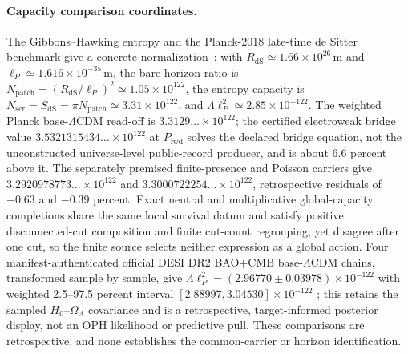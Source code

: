 \paragraph{Capacity comparison coordinates.}
The Gibbons--Hawking entropy and the Planck-2018 late-time de Sitter
benchmark give a concrete normalization~\cite{gibbonsHawking77,planck18}:
with \(R_{\mathrm{dS}}\simeq1.66\times10^{26}\,\mathrm m\) and
\(\ell_P\simeq1.616\times10^{-35}\,\mathrm m\), the bare horizon ratio is
\(N_{\mathrm{patch}}=(R_{\mathrm{dS}}/\ell_P)^2\simeq1.05\times10^{122}\), the
entropy capacity is
\(N_{\mathrm{scr}}=S_{\mathrm{dS}}=\pi N_{\mathrm{patch}}\simeq3.31\times10^{122}\),
and \(\Lambda\ell_P^2\simeq2.85\times10^{-122}\). The weighted Planck
base-\(\Lambda\)CDM read-off is \(3.3129\ldots\times10^{122}\); the certified
electroweak bridge value \(3.5321315434\ldots\times10^{122}\) at
\(P_{\mathrm{fwd}}\) solves the declared bridge equation, not the
unconstructed universe-level public-record producer, and is about \(6.6\)
percent above it. The separately premised finite-presence and Poisson carriers
give \(3.2920978773\ldots\times10^{122}\) and \(3.3000722254\ldots\times10^{122}\),
retrospective residuals of \(-0.63\) and \(-0.39\) percent. Exact neutral and
multiplicative global-capacity completions share the same local survival
datum and satisfy positive disconnected-cut composition and finite cut-count
regrouping, yet disagree after one cut, so the finite source selects neither
expression as a global action. Four manifest-authenticated official DESI DR2
BAO+CMB base-\(\Lambda\)CDM chains, transformed sample by sample, give
\(\Lambda\ell_P^2=(2.96770\mathbin{\pm}0.03978)\times10^{-122}\) with weighted
2.5--97.5 percent interval \([2.88997,3.04530]\times10^{-122}\)
\cite{desidr2,ophrepo}; this retains the sampled
\(H_0\)--\(\Omega_\Lambda\) covariance and is a retrospective, target-informed
posterior display, not an OPH likelihood or predictive pull. These
comparisons are retrospective, and none establishes the common-carrier or
horizon identification.

